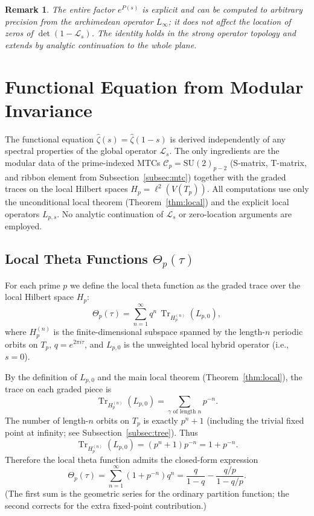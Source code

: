 \documentclass[11pt,a4paper]{amsart}
\newtheorem{remark}[theorem]{Remark}
\begin{document}
\begin{remark}
The entire factor \(e^{P(s)}\) is explicit and can be computed to arbitrary precision from the archimedean operator \(L_\infty\); it does not affect the location of zeros of \(\det(1 - \mathcal{L}_s)\). The identity holds in the strong operator topology and extends by analytic continuation to the whole plane.
\end{remark}

\section{Functional Equation from Modular Invariance}
\label{sec:func-eq}

The functional equation \(\hat{\zeta}(s)=\hat{\zeta}(1-s)\) is derived independently of any spectral properties of the global operator \(\mathcal{L}_s\). The only ingredients are the modular data of the prime-indexed MTCs \(\mathcal{C}_p=\mathrm{SU}(2)_{p-2}\) (S-matrix, T-matrix, and ribbon element from Subsection~\ref{subsec:mtc}) together with the graded traces on the local Hilbert spaces \(H_p=\ell^2(V(T_p))\). All computations use only the unconditional local theorem (Theorem~\ref{thm:local}) and the explicit local operators \(L_{p,s}\). No analytic continuation of \(\mathcal{L}_s\) or zero-location arguments are employed.

\subsection{Local Theta Functions \(\Theta_p(\tau)\)}
\label{subsec:local-theta}

For each prime \(p\) we define the local theta function as the graded trace over the local Hilbert space \(H_p\):
\[
\Theta_p(\tau)=\sum_{n=1}^\infty q^n\,\operatorname{Tr}_{H_p^{(n)}}(L_{p,0}),
\]
where \(H_p^{(n)}\) is the finite-dimensional subspace spanned by the length-\(n\) periodic orbits on \(T_p\), \(q=e^{2\pi i\tau}\), and \(L_{p,0}\) is the unweighted local hybrid operator (i.e., \(s=0\)).

By the definition of \(L_{p,0}\) and the main local theorem (Theorem~\ref{thm:local}), the trace on each graded piece is
\[
\operatorname{Tr}_{H_p^{(n)}}(L_{p,0})=\sum_{\gamma\text{ of length }n}p^{-n}.
\]
The number of length-\(n\) orbits on \(T_p\) is exactly \(p^n+1\) (including the trivial fixed point at infinity; see Subsection~\ref{subsec:tree}). Thus
\[
\operatorname{Tr}_{H_p^{(n)}}(L_{p,0})=(p^n+1)p^{-n}=1+p^{-n}.
\]
Therefore the local theta function admits the closed-form expression
\[
\Theta_p(\tau)=\sum_{n=1}^\infty(1+p^{-n})q^n=\frac{q}{1-q}-\frac{q/p}{1-q/p}.
\]
(The first sum is the geometric series for the ordinary partition function; the second corrects for the extra fixed-point contribution.)
\end{document}
